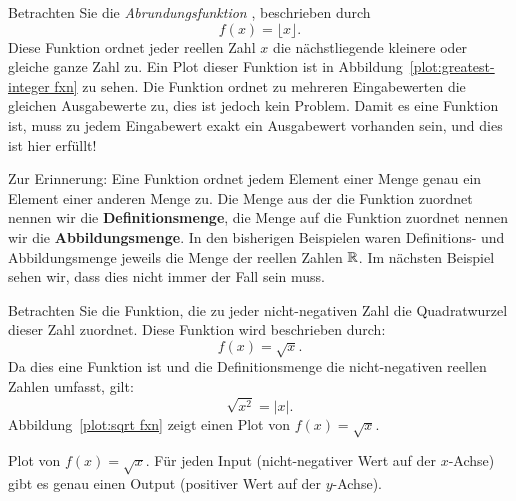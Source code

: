 \begin{example}
Betrachten Sie die \textit{Abrundungsfunktion }, beschrieben durch
\[
f(x) = \lfloor x \rfloor.
\]
Diese Funktion ordnet jeder reellen Zahl $x$ die nächstliegende kleinere oder gleiche ganze Zahl zu. Ein Plot dieser Funktion ist in Abbildung~\ref{plot:greatest-integer fxn} zu sehen. Die Funktion ordnet zu mehreren Eingabewerten die gleichen Ausgabewerte zu, dies ist jedoch kein Problem. Damit es eine Funktion ist, muss zu jedem Eingabewert exakt ein Ausgabewert vorhanden sein, und dies ist hier erfüllt!
\end{example}



Zur Erinnerung: Eine Funktion ordnet jedem Element einer Menge genau ein Element einer anderen Menge zu. Die Menge aus der die Funktion zuordnet nennen wir die \textbf{Definitionsmenge}, die Menge auf die Funktion zuordnet nennen wir die \textbf{Abbildungsmenge}. In den bisherigen Beispielen waren Definitions- und Abbildungsmenge jeweils die Menge der reellen Zahlen $\mathbb{R}$. Im nächsten Beispiel sehen wir, dass dies nicht immer der Fall sein muss.

\begin{example}
Betrachten Sie die Funktion, die zu jeder nicht-negativen Zahl die Quadratwurzel dieser Zahl zuordnet. Diese Funktion wird beschrieben durch:
\[
f(x) = \sqrt{x}.
\]
Da dies eine Funktion ist und die Definitionsmenge die nicht-negativen reellen Zahlen umfasst, gilt:
\[
\sqrt{x^2} = |x|.
\]
Abbildung~\ref{plot:sqrt fxn} zeigt einen Plot von $f(x) = \sqrt{x}$.
\end{example}

\begin{marginfigure}[0in]
\caption{Plot von $f(x)=\sqrt{x}$. Für jeden Input (nicht-negativer Wert auf der $x$-Achse) gibt es genau einen Output (positiver Wert auf der $y$-Achse).}
\label{plot:sqrt fxn}
\end{marginfigure}



